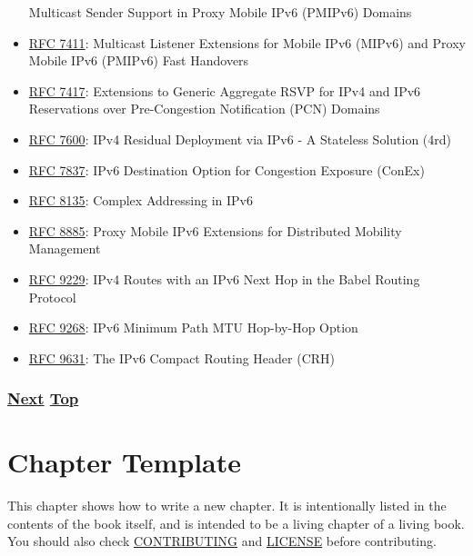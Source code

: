 \documentclass[
]{article}
\begin{document}
\begin{itemize}
  Multicast Sender Support in Proxy Mobile IPv6 (PMIPv6) Domains
\item
  \href{https://www.rfc-editor.org/info/rfc7411}{RFC 7411}: Multicast
  Listener Extensions for Mobile IPv6 (MIPv6) and Proxy Mobile IPv6
  (PMIPv6) Fast Handovers
\item
  \href{https://www.rfc-editor.org/info/rfc7417}{RFC 7417}: Extensions
  to Generic Aggregate RSVP for IPv4 and IPv6 Reservations over
  Pre-Congestion Notification (PCN) Domains
\item
  \href{https://www.rfc-editor.org/info/rfc7600}{RFC 7600}: IPv4
  Residual Deployment via IPv6 - A Stateless Solution (4rd)
\item
  \href{https://www.rfc-editor.org/info/rfc7837}{RFC 7837}: IPv6
  Destination Option for Congestion Exposure (ConEx)
\item
  \href{https://www.rfc-editor.org/info/rfc8135}{RFC 8135}: Complex
  Addressing in IPv6
\item
  \href{https://www.rfc-editor.org/info/rfc8885}{RFC 8885}: Proxy Mobile
  IPv6 Extensions for Distributed Mobility Management
\item
  \href{https://www.rfc-editor.org/info/rfc9229}{RFC 9229}: IPv4 Routes
  with an IPv6 Next Hop in the Babel Routing Protocol
\item
  \href{https://www.rfc-editor.org/info/rfc9268}{RFC 9268}: IPv6 Minimum
  Path MTU Hop-by-Hop Option
\item
  \href{https://www.rfc-editor.org/info/rfc9631}{RFC 9631}: The IPv6
  Compact Routing Header (CRH)
\end{itemize}

\subsubsection{\texorpdfstring{\hyperref[chapter-template]{Next}
\hyperref[further-reading]{Top}}{Next Top}}\label{next-top-9}

\pagebreak

\section{Chapter Template}\label{chapter-template}

This chapter shows how to write a new chapter. It is intentionally
listed in the contents of the book itself, and is intended to be a
living chapter of a living book. You should also check
\href{https://github.com/becarpenter/book6/blob/main/CONTRIBUTING.md}{CONTRIBUTING}
and
\href{https://github.com/becarpenter/book6/blob/main/LICENSE.md}{LICENSE}
before contributing.
\end{document}
